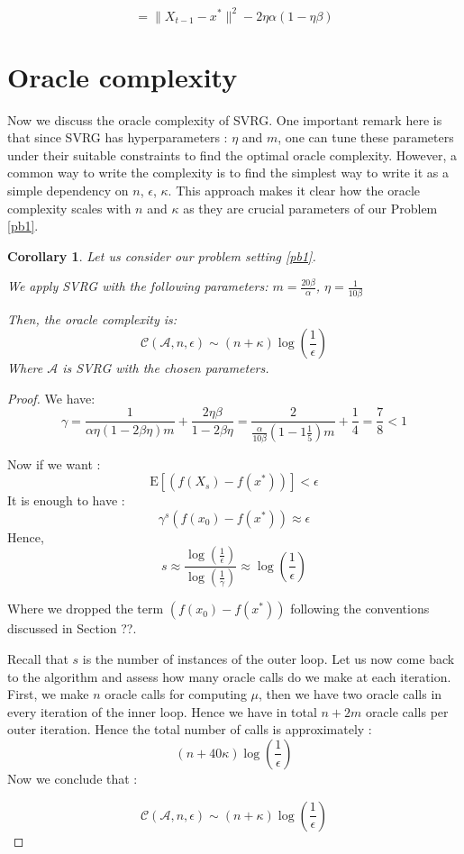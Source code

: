 \documentclass[12pt]{report}
\newtheorem{corollary}[lemma]{Corollary}
\newcounter{theo}[section]
\newcommand{\E}{\mathrm{E}}
\begin{document}
$$=\|{X}_{t-1}-x^*\|^2-2\eta\alpha(1-\eta\beta)$$






\section{Oracle complexity}
Now we discuss the oracle complexity of SVRG. One important remark here is that since SVRG has hyperparameters : $\eta$ and $m$, one can tune these parameters under their suitable constraints to find the optimal oracle complexity. However, a common way to write the complexity is to find the simplest way to write it as a simple dependency on $n$, $\epsilon$, $\kappa$. This approach makes it clear how the oracle complexity scales with $n$ and $\kappa$ as they are crucial parameters of our Problem \ref{pb1}.
\begin{corollary}


Let us consider our problem setting \ref{pb1}.

We apply SVRG with the following parameters:
$m=\frac{20\beta}{\alpha}$,  $\eta=\frac{1}{10\beta}$

Then, the oracle complexity is:
$$ \mathcal{C}(\mathcal{A},n,\epsilon)\sim \left(n+\kappa \right)\log\left(\frac{1}{\epsilon}\right)$$
Where $\mathcal{A}$ is SVRG with the chosen parameters.
\end{corollary}

\begin{proof}
We have:
$$\gamma=\frac{1}{\alpha\eta(1-2\beta\eta)m}+\frac{2\eta\beta}{1-2\beta\eta}=\frac{2}{\frac{\alpha}{10\beta}(1-1\frac{1}{5})m}+\frac{1}{4}=\frac{7}{8}<1$$


Now if we want : $$\E[\left(f({X}_s)-f(x^*)\right)]<\epsilon $$
It is enough to have : 
$$\gamma^s \left(f({x}_{0})-f(x^*)\right)\approx \epsilon$$
Hence, $$s \approx \frac{\log(\frac{1}{\epsilon})}{\log(\frac{1}{\gamma})} \approx {\log\left(\frac{1}{\epsilon}\right)}$$

Where we dropped the term $\left(f({x}_{0})-f(x^*)\right)$  following the conventions discussed in Section ??.

Recall that $s$ is the number of instances of the outer loop. Let us now come back to the algorithm and assess how many oracle calls do we make at each iteration. First, we make $n$ oracle calls for computing $\mu$, then we have two oracle calls in every iteration of the inner loop. Hence we have in total $n+2m$ oracle calls per outer iteration.
Hence the total number of calls is approximately :
$$(n+40\kappa) {\log\left(\frac{1}{\epsilon}\right)}$$
Now we conclude that :

$$ \mathcal{C}(\mathcal{A},n,\epsilon)\sim \left(n+\kappa \right)\log\left(\frac{1}{\epsilon}\right)$$


\end{proof}
\end{document}
